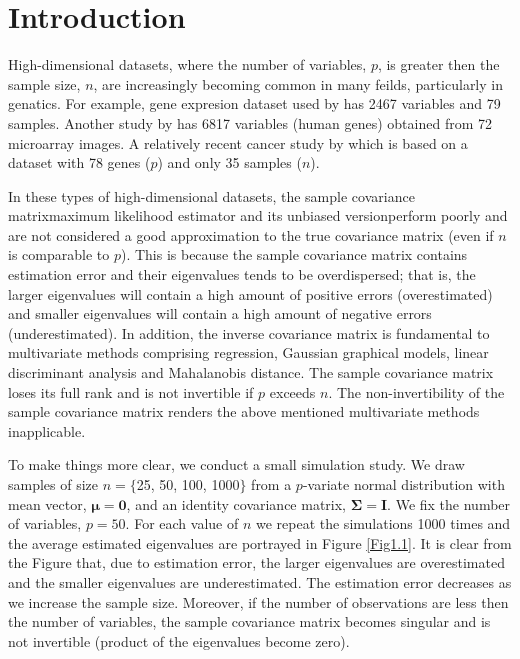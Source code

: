 
\chapter{Introduction}  %


High-dimensional datasets, where the number of variables, $p$, is greater then the sample size, $n$, are increasingly becoming common in many feilds, particularly in genatics. For example, gene expresion dataset used by \cite{eisen1998cluster} has 2467 variables and 79 samples. Another study by \cite{tamayo1999interpreting} has 6817 variables (human genes) obtained from 72 microarray images. A relatively recent cancer study by \cite{beerenwinkel2007genetic} which is based on a dataset with 78 genes ($p$) and only 35 samples ($n$).

In these types of high-dimensional datasets, the sample covariance matrix\textemdash maximum likelihood estimator and its unbiased version\textemdash perform poorly and are not considered a good approximation to the true covariance matrix (even if $n$ is comparable to $p$). This is because the sample covariance matrix contains estimation error and their eigenvalues tends to be overdispersed; that is, the larger eigenvalues will contain a high amount of positive errors (overestimated) and smaller eigenvalues will contain a high amount of negative errors (underestimated). In addition, the inverse covariance matrix is fundamental to multivariate methods comprising regression, Gaussian graphical models, linear discriminant analysis and Mahalanobis distance. The sample covariance matrix loses its full rank and is not invertible if $p$ exceeds $n$. The non-invertibility of the sample covariance matrix renders the above mentioned multivariate methods inapplicable.  
 
To make things more clear, we conduct a small simulation study. We draw samples of size $n = \lbrace$25, 50, 100, 1000$\rbrace$ from a $p$-variate normal distribution with mean vector, $\pmb{\mu}=\textbf{0}$, and an identity covariance matrix, $\pmb{\Sigma} = \pmb{I}$. We fix the number of variables, $p=50$. For each value of $n$ we repeat the simulations 1000 times and the average estimated eigenvalues are portrayed in Figure \ref{Fig1.1}. It is clear from the Figure that, due to estimation error, the larger eigenvalues are overestimated and the smaller eigenvalues are underestimated. The estimation error decreases as we increase the sample size. Moreover, if the number of observations are less then the number of variables, the sample covariance matrix becomes singular and is not invertible (product of the eigenvalues become zero).
 
